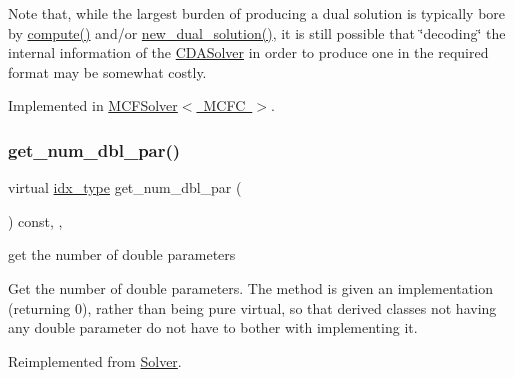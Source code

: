 Note that, while the largest burden of producing a dual solution is typically bore by \mbox{\hyperlink{class_s_m_spp__di__unipi__it_1_1_solver_a504d4e3e174c7a518cc66156a8a45ce5}{compute()}} and/or \mbox{\hyperlink{class_s_m_spp__di__unipi__it_1_1_c_d_a_solver_a8c650415b6673c33692c363abdfdef00}{new\+\_\+dual\+\_\+solution()}}, it is still possible that \char`\"{}decoding\char`\"{} the internal information of the \mbox{\hyperlink{class_s_m_spp__di__unipi__it_1_1_c_d_a_solver}{C\+D\+A\+Solver}} in order to produce one in the required format may be somewhat costly. 

Implemented in \mbox{\hyperlink{class_s_m_spp__di__unipi__it_1_1_m_c_f_solver_a7ceb04914b5dcbb1cfd8f0e844b56014}{M\+C\+F\+Solver$<$ M\+C\+F\+C $>$}}.

\mbox{\label{class_s_m_spp__di__unipi__it_1_1_c_d_a_solver_a842fd454acaded84baf6b77e0d61a950}} 
\subsubsection{\texorpdfstring{get\+\_\+num\+\_\+dbl\+\_\+par()}{get\_num\_dbl\_par()}}
{\footnotesize\ttfamily virtual \mbox{\hyperlink{class_s_m_spp__di__unipi__it_1_1_thin_compute_interface_aa3d710629ad8c434286726ad810c3b47}{idx\+\_\+type}} get\+\_\+num\+\_\+dbl\+\_\+par (\begin{DoxyParamCaption}\item[{void}]{ }\end{DoxyParamCaption}) const\hspace{0.3cm}{\ttfamily [inline]}, {\ttfamily [override]}, {\ttfamily [virtual]}}



get the number of double parameters 

Get the number of double parameters. The method is given an implementation (returning 0), rather than being pure virtual, so that derived classes not having any double parameter do not have to bother with implementing it. 

Reimplemented from \mbox{\hyperlink{class_s_m_spp__di__unipi__it_1_1_solver_a842fd454acaded84baf6b77e0d61a950}{Solver}}.



